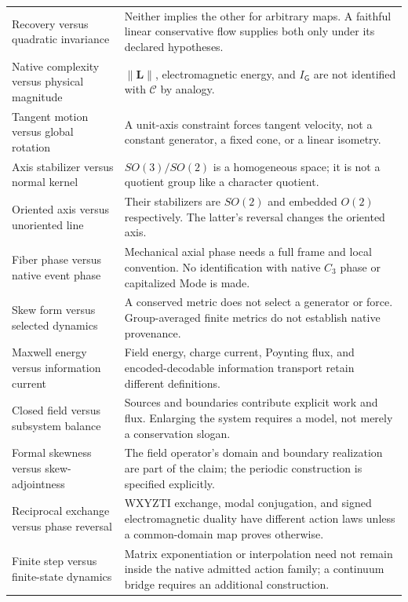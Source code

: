 \begin{longtable}{@{}p{}p{}@{}}
Recovery versus quadratic invariance & Neither implies the other for arbitrary maps. A faithful linear conservative flow supplies both only under its declared hypotheses. \\
Native complexity versus physical magnitude & $\|\mathbf L\|$, electromagnetic energy, and $I_{\mathsf G}$ are not identified with $\mathcal C$ by analogy. \\
Tangent motion versus global rotation & A unit-axis constraint forces tangent velocity, not a constant generator, a fixed cone, or a linear isometry. \\
Axis stabilizer versus normal kernel & $SO(3)/SO(2)$ is a homogeneous space; it is not a quotient group like a character quotient. \\
Oriented axis versus unoriented line & Their stabilizers are $SO(2)$ and embedded $O(2)$ respectively. The latter's reversal changes the oriented axis. \\
Fiber phase versus native event phase & Mechanical axial phase needs a full frame and local convention. No identification with native $C_3$ phase or capitalized Mode is made. \\
Skew form versus selected dynamics & A conserved metric does not select a generator or force. Group-averaged finite metrics do not establish native provenance. \\
Maxwell energy versus information current & Field energy, charge current, Poynting flux, and encoded-decodable information transport retain different definitions. \\
Closed field versus subsystem balance & Sources and boundaries contribute explicit work and flux. Enlarging the system requires a model, not merely a conservation slogan. \\
Formal skewness versus skew-adjointness & The field operator's domain and boundary realization are part of the claim; the periodic construction is specified explicitly. \\
Reciprocal exchange versus phase reversal & WXYZTI exchange, modal conjugation, and signed electromagnetic duality have different action laws unless a common-domain map proves otherwise. \\
Finite step versus finite-state dynamics & Matrix exponentiation or interpolation need not remain inside the native admitted action family; a continuum bridge requires an additional construction. \\


\end{longtable}
